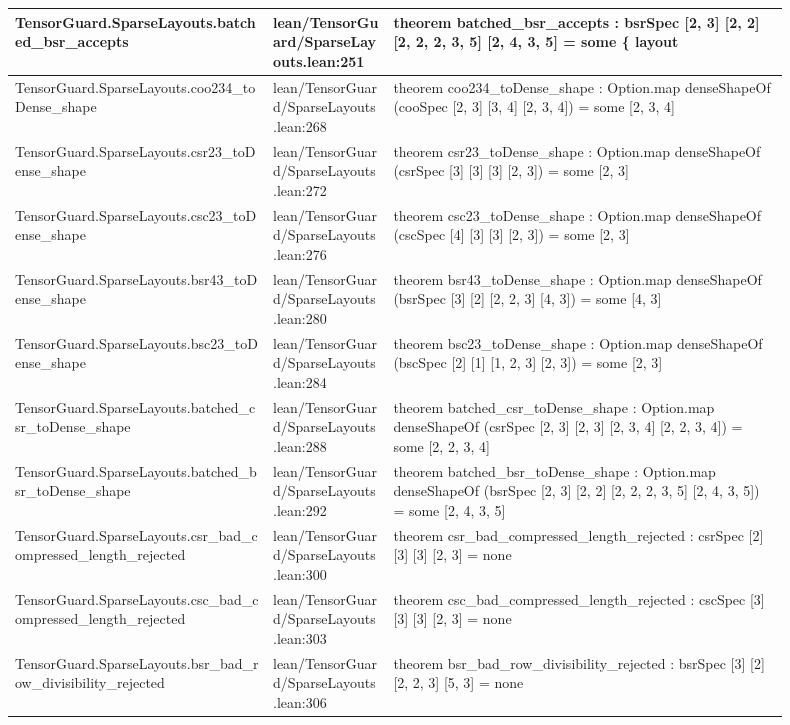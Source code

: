\documentclass[10pt]{article}
\begin{document}
\begin{longtable}{|p{0.30\linewidth}|p{0.14\linewidth}|p{0.46\linewidth}|}
\hline
TensorGuard.SparseLayouts.batched\_bsr\_accepts & lean/TensorGuard/SparseLayouts.lean:251 & theorem batched\_bsr\_accepts : bsrSpec [2, 3] [2, 2] [2, 2, 2, 3, 5] [2, 4, 3, 5] = some \{ layout \\
\hline
TensorGuard.SparseLayouts.coo234\_toDense\_shape & lean/TensorGuard/SparseLayouts.lean:268 & theorem coo234\_toDense\_shape : Option.map denseShapeOf (cooSpec [2, 3] [3, 4] [2, 3, 4]) = some [2, 3, 4] \\
\hline
TensorGuard.SparseLayouts.csr23\_toDense\_shape & lean/TensorGuard/SparseLayouts.lean:272 & theorem csr23\_toDense\_shape : Option.map denseShapeOf (csrSpec [3] [3] [3] [2, 3]) = some [2, 3] \\
\hline
TensorGuard.SparseLayouts.csc23\_toDense\_shape & lean/TensorGuard/SparseLayouts.lean:276 & theorem csc23\_toDense\_shape : Option.map denseShapeOf (cscSpec [4] [3] [3] [2, 3]) = some [2, 3] \\
\hline
TensorGuard.SparseLayouts.bsr43\_toDense\_shape & lean/TensorGuard/SparseLayouts.lean:280 & theorem bsr43\_toDense\_shape : Option.map denseShapeOf (bsrSpec [3] [2] [2, 2, 3] [4, 3]) = some [4, 3] \\
\hline
TensorGuard.SparseLayouts.bsc23\_toDense\_shape & lean/TensorGuard/SparseLayouts.lean:284 & theorem bsc23\_toDense\_shape : Option.map denseShapeOf (bscSpec [2] [1] [1, 2, 3] [2, 3]) = some [2, 3] \\
\hline
TensorGuard.SparseLayouts.batched\_csr\_toDense\_shape & lean/TensorGuard/SparseLayouts.lean:288 & theorem batched\_csr\_toDense\_shape : Option.map denseShapeOf (csrSpec [2, 3] [2, 3] [2, 3, 4] [2, 2, 3, 4]) = some [2, 2, 3, 4] \\
\hline
TensorGuard.SparseLayouts.batched\_bsr\_toDense\_shape & lean/TensorGuard/SparseLayouts.lean:292 & theorem batched\_bsr\_toDense\_shape : Option.map denseShapeOf (bsrSpec [2, 3] [2, 2] [2, 2, 2, 3, 5] [2, 4, 3, 5]) = some [2, 4, 3, 5] \\
\hline
TensorGuard.SparseLayouts.csr\_bad\_compressed\_length\_rejected & lean/TensorGuard/SparseLayouts.lean:300 & theorem csr\_bad\_compressed\_length\_rejected : csrSpec [2] [3] [3] [2, 3] = none \\
\hline
TensorGuard.SparseLayouts.csc\_bad\_compressed\_length\_rejected & lean/TensorGuard/SparseLayouts.lean:303 & theorem csc\_bad\_compressed\_length\_rejected : cscSpec [3] [3] [3] [2, 3] = none \\
\hline
TensorGuard.SparseLayouts.bsr\_bad\_row\_divisibility\_rejected & lean/TensorGuard/SparseLayouts.lean:306 & theorem bsr\_bad\_row\_divisibility\_rejected : bsrSpec [3] [2] [2, 2, 3] [5, 3] = none \\

\end{longtable}
\end{document}

